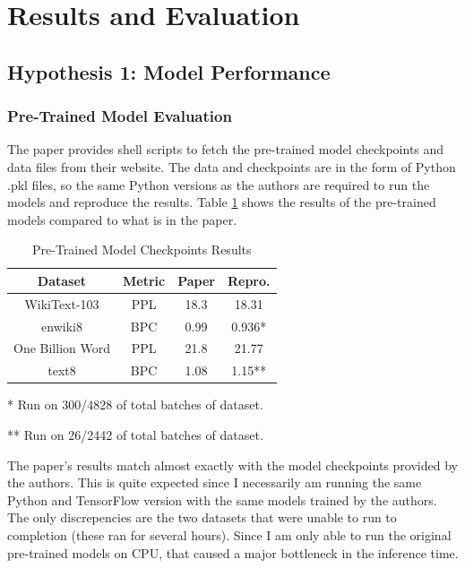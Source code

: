 \documentclass[11pt]{article}
\begin{document}
\section{Results and Evaluation}

\subsection{Hypothesis 1: Model Performance}

\subsubsection{Pre-Trained Model Evaluation}

The paper provides shell scripts to fetch the pre-trained model checkpoints and data files from their website. The data and checkpoints are in the form of Python .pkl files, so the same Python versions as the authors are required to run the models and reproduce the results. Table \ref{tab:pretrained_results} shows the results of the pre-trained models compared to what is in the paper.

\begin{table}[!hbtp]
\begin{center}
\caption{Pre-Trained Model Checkpoints Results}
\label{tab:pretrained_results}
\begin{tabular}{ |c|c|c|c| }
 \hline
 Dataset & Metric & Paper & Repro. \\
 \hline
 WikiText-103 & PPL & 18.3 & 18.31 \\ 
 enwiki8 & BPC & 0.99 & 0.936* \\ 
 One Billion Word & PPL & 21.8 & 21.77 \\ 
 text8 & BPC & 1.08 & 1.15** \\
 \hline
\end{tabular}
\begin{tablenotes}
  \item[*] * Run on 300/4828 of total batches of dataset.
  \item[*] ** Run on 26/2442 of total batches of dataset.
  \end{tablenotes}
\end{center}
\end{table}

The paper's results match almost exactly with the model checkpoints provided by the authors. This is quite expected since I necessarily am running the same Python and TensorFlow version with the same models trained by the authors. The only discrepencies are the two datasets that were unable to run to completion (these ran for several hours). Since I am only able to run the original pre-trained models on CPU, that caused a major bottleneck in the inference time. 
\end{document}
